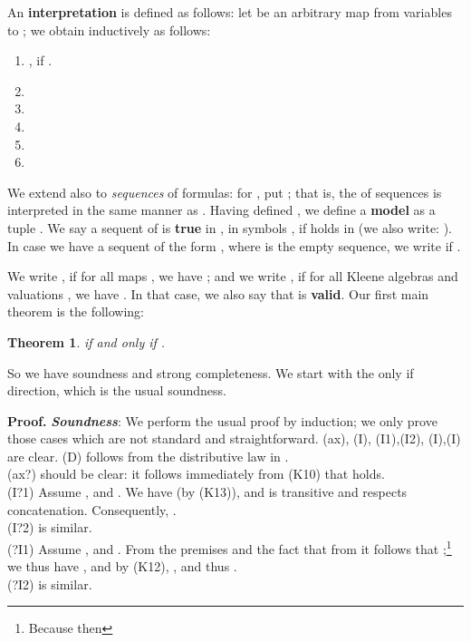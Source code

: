 \documentclass{eptcs}
\newtheorem{thm}[defn]{Theorem}
\newcommand{\proofbeg}{\textbf{Proof. }}
\begin{document}
An \textbf{interpretation} 
 is defined as
follows: let  be an arbitrary
map from variables to ; 
we obtain  inductively as follows:
\begin{enumerate}
\item , if .
\item 
\item 
\item 
\item 
\item 
\end{enumerate}

We extend  also to \textit{sequences} of formulas:
for , put 
;
that is, the  of sequences is interpreted in the same manner
as .
Having defined , we define a \textbf{model} as a tuple
. We say a sequent  of  is
\textbf{true} in , in symbols
, if
 holds in 
(we also write: ).
In case we have a sequent of the form , where
 is the empty sequence, we write
 if
.

We write , if for all maps
, we have
; and we write
, if for all Kleene algebras
 and valuations , we have
. In that case, 
we also say that  is \textbf{valid}.
Our first main theorem is the following:

\begin{thm}
 if and only if 
.
\end{thm}

So we have soundness and strong completeness. We start
with the only if direction, which is the usual soundness.

\proofbeg
\textit{\textbf{Soundness}}: We perform the usual proof by induction; 
we only prove those
cases which are not standard and straightforward. 
(ax), (I), (I1),(I2),
(I),(I) are clear.
(D) follows from the distributive law in .
\\

(ax?) should be clear: it follows immediately from (K10) 
that  holds.
\\

(I?1) 
Assume , and 
. 
We have  (by (K13)), and  is transitive and
respects concatenation. Consequently, 
.
\\

(I?2) is similar.
\\

(?I1) 
Assume , and
.
From the premises and the fact that from  it follows
that ;\footnote{Because 
then } we thus have
,
and by (K12),
, and thus
.
\\

(?I2) is similar.
\\
\end{document}
